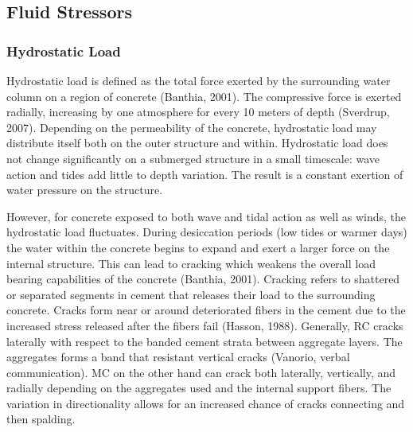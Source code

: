 \documentclass[12pt]{article}
\begin{document}
\subsection*{Fluid Stressors}

\subsubsection*{Hydrostatic Load}

Hydrostatic load is defined as the total force exerted by the surrounding water column on a region of concrete (Banthia, 2001). The compressive force is exerted radially, increasing by one atmosphere for every 10 meters of depth (Sverdrup, 2007). Depending on the permeability of the concrete, hydrostatic load may distribute itself both on the outer structure and within. Hydrostatic load does not change significantly on a submerged structure in a small timescale: wave action and tides add little to depth variation. The result is a constant exertion of water pressure on the structure. 

However, for concrete exposed to both wave and tidal action as well as winds, the hydrostatic load fluctuates. During desiccation periods (low tides or warmer days) the water within the concrete begins to expand and exert a larger force on the internal structure. This can lead to cracking which weakens the overall load bearing capabilities of the concrete (Banthia, 2001). Cracking refers to shattered or separated segments in cement that releases their load to the surrounding concrete. Cracks form near or around deteriorated fibers in the cement due to the increased stress released after the fibers fail (Hasson, 1988). Generally, RC cracks laterally with respect to the banded cement strata between aggregate layers. The aggregates forms a band that resistant vertical cracks (Vanorio, verbal communication). MC on the other hand can crack both laterally, vertically, and radially depending on the aggregates used and the internal support fibers. The variation in directionality allows for an increased chance of cracks connecting and then spalding. 
\end{document}
